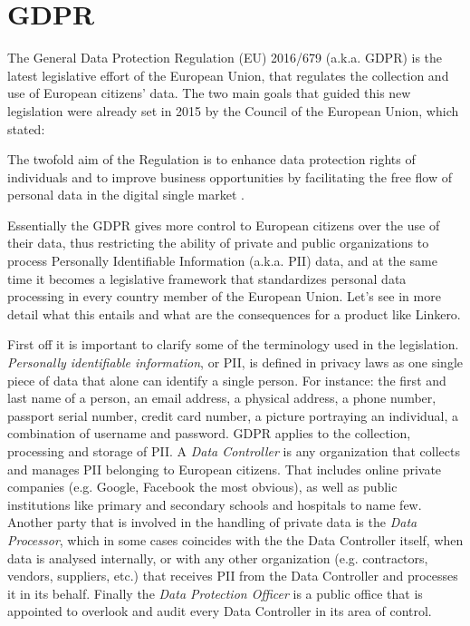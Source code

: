 \section{GDPR}
The General Data Protection Regulation (EU) 2016/679 (a.k.a. GDPR) is the latest
legislative effort of the European Union, that regulates the collection
and use of European citizens' data. The two main goals that guided this new
legislation were already set in 2015 by the Council of the European Union, which
stated:
\begin{displayquote}
The twofold aim of the Regulation is to enhance data
protection rights of individuals and to improve business opportunities by facilitating the free
flow of personal data in the digital single market \cite{CoEU956515}.
\end{displayquote}
Essentially the GDPR gives more control to European citizens over the use of
their data, thus restricting the ability of private and public organizations to
process Personally Identifiable Information (a.k.a. PII) data, and at the same
time it becomes a legislative framework that standardizes personal data
processing in every country member of the European Union. Let's see in more
detail what this entails and what are the consequences for a product like
Linkero.

First off it is important to clarify some of the terminology used in the
legislation. \emph{Personally identifiable information}, or PII, is defined in
privacy laws as one single piece of data that alone can identify a single person. For
instance: the first and last name of a person, an email address, a physical
address, a phone number, passport serial number, credit card number, a picture portraying an
individual, a combination of username and password. GDPR applies to the
collection, processing and storage of PII. A \emph{Data Controller} is any
organization that collects and manages PII belonging to European citizens. That
includes online private companies (e.g. Google, Facebook the most obvious), as well as
public institutions like primary and secondary schools and hospitals to name
few. Another party that is involved in the handling of private data is the
\emph{Data Processor}, which in some cases coincides with the the Data
Controller itself, when data is analysed internally, or with any other organization (e.g.
contractors, vendors, suppliers, etc.) that receives PII from the Data Controller
and processes it in its behalf. Finally the \emph{Data Protection Officer} is a
public office that is appointed to overlook and audit every Data Controller in
its area of control.

